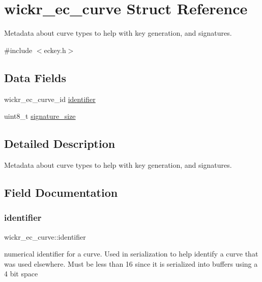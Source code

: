 \hypertarget{structwickr__ec__curve}{}\section{wickr\+\_\+ec\+\_\+curve Struct Reference}
\label{structwickr__ec__curve}


Metadata about curve types to help with key generation, and signatures.  




{\ttfamily \#include $<$eckey.\+h$>$}

\subsection*{Data Fields}
\begin{DoxyCompactItemize}
\item 
wickr\+\_\+ec\+\_\+curve\+\_\+id \hyperlink{structwickr__ec__curve_a6a3db9bd65c2b95edec61e0b48760bf4}{identifier}
\item 
uint8\+\_\+t \hyperlink{structwickr__ec__curve_ab77300e816beace29e40cf8e643a5070}{signature\+\_\+size}
\end{DoxyCompactItemize}


\subsection{Detailed Description}
Metadata about curve types to help with key generation, and signatures. 

\subsection{Field Documentation}
\mbox{\label{structwickr__ec__curve_a6a3db9bd65c2b95edec61e0b48760bf4}} 
\subsubsection{\texorpdfstring{identifier}{identifier}}
{\footnotesize\ttfamily wickr\+\_\+ec\+\_\+curve\+::identifier}

numerical identifier for a curve. Used in serialization to help identify a curve that was used elsewhere. Must be less than 16 since it is serialized into buffers using a 4 bit space \mbox{\label{structwickr__ec__curve_ab77300e816beace29e40cf8e643a5070}} 
